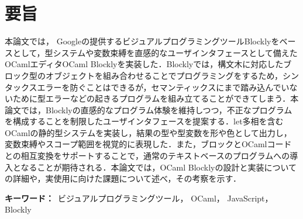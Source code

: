 \chapter*{要旨}

本論文では，
Googleの提供するビジュアルプログラミングツールBlocklyをベースとして，型システムや変数束縛を直感的なユーザインタフェースとして備えたOCamlエディタOCaml Blocklyを実装した．Blocklyでは，構文木に対応したブロック型のオブジェクトを組み合わせることでプログラミングをするため，シンタックスエラーを防ぐことはできるが，セマンティックスにまで踏み込んでいないために型エラーなどの起きるプログラムを組み立てることができてしまう．本論文では，Blocklyの直感的なプログラム体験を維持しつつ，不正なプログラムを構成することを制限したユーザインタフェースを提案する．let多相を含むOCamlの静的型システムを実装し，結果の型や型変数を形や色として出力し，変数束縛やスコープ範囲を視覚的に表現した．また，ブロックとOCamlコードとの相互変換をサポートすることで，通常のテキストベースのプログラムへの導入となることが期待される．本論文では，OCaml Blocklyの設計と実装についての詳細や，実使用に向けた課題について述べ，その考察を示す．

{\bf キーワード：}\ 
ビジュアルプログラミングツール，
OCaml，
JavaScript，
Blockly
